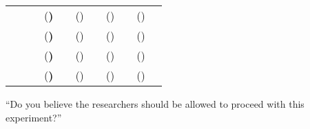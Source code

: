 \begin{subtable}{.95\textwidth}
\begin{tabular}{r|l*{4}{|rr}|r}
\hline
{} &
&  &(\bf {})
&  &()
&  &()
&  &()
& 
\\
 &
&  &(\bf {})
&  &()
&  &()
&  &()
& 
\\
 &
&  &(\bf {})
&  &()
&  &()
&  &()
& 
\\
 &
&  &(\bf {})
&  &()
&  &()
&  &()
& 
\\
\end{tabular}
\caption{``Do you believe the researchers should be allowed to proceed with this experiment?''}
\label{tab:unaware:proceed}
\end{subtable}
